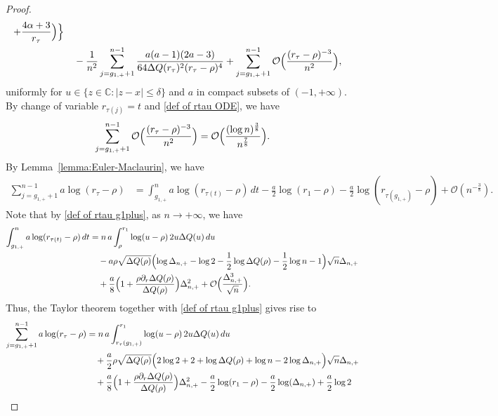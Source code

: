 \documentclass[reqno]{amsart}
\newcommand{\1}{\mathds{1}}
\newcommand{\C}{\mathds{C}}
\numberwithin{equation}{section}
\theoremstyle{definition}
\begin{document}
\begin{proof}
\begin{align*}
+\frac{4\alpha+3}{r_{\tau}}
\Bigr)
\Bigr\}
\\
&\quad
-\frac{1}{n^2}
\sum_{j=g_{1,+}+1}^{n-1}
\frac{a(a-1)(2a-3)}{64\Delta Q(r_{\tau})^2(r_{\tau}-\rho)^4}
+
\sum_{j=g_{1,+}+1}^{n-1}
\mathcal{O}\Bigl(\frac{(r_{\tau}-\rho)^{-3}}{n^2}\Bigr), 
\end{align*} 
uniformly for $u\in\{z\in\C:|z-x|\leq \delta\}$ and $a$ in compact subsets of $(-1,+\infty)$. 
By change of variable $r_{\tau(j)}=t$ and \eqref{def of rtau ODE}, we have 
\begin{equation}
\label{def of summation in 4 S3}
\sum_{j=g_{1,+}+1}^{n-1}
\mathcal{O}\Bigl(\frac{(r_{\tau}-\rho)^{-3}}{n^2}\Bigr)
=
\mathcal{O}\Bigl(\frac{(\log n)^{\frac{3}{8}}}{n^{\frac{7}{8}}}\Bigr). 
\end{equation}
By Lemma~\ref{lemma:Euler-Maclaurin}, we have 
\begin{align*}
\sum_{j=g_{1,+}+1}^{n-1}a\log(r_{\tau}-\rho)
&=  
\int_{g_{1,+}}^{n}a\log(r_{\tau(t)}-\rho)\,dt
-\frac{a}{2}\log(r_1-\rho)-\frac{a}{2}\log(r_{\tau(g_{1,+})}-\rho)
+\mathcal{O}(n^{-\frac{3}{8}}). 
\end{align*} 
Note that by \eqref{def of rtau g1plus}, as $n\to+\infty$, we have 
\begin{align*}
\int_{g_{1,+}}^{n}a\log(r_{\tau(t)}-\rho)\,dt
&=n\,a\int_{\rho}^{r_1}\log (u-\rho)\,2u\Delta Q(u)\,du
\\
&\quad
-a\rho\sqrt{\Delta Q(\rho)}
\Bigl( 
\log\Delta_{n,+}-\log 2-\frac{1}{2}\log\Delta Q(\rho)-\frac{1}{2}\log n-1
\Bigr)\sqrt{n}\Delta_{n,+}
\\
&\quad
+\frac{a}{8}\Bigl(1+\frac{\rho\partial_r\Delta Q(\rho)}{\Delta Q(\rho)}\Bigr)\Delta_{n,+}^2
+
\mathcal{O}\Bigl( 
\frac{\Delta_{n,+}^3}{\sqrt{n}}
\Bigr).
\end{align*}
Thus, the Taylor theorem together with \eqref{def of rtau g1plus} gives rise to
\begin{align}
\begin{split}
\label{def of summation in 1 S3}
\sum_{j=g_{1,+}+1}^{n-1}a\log(r_{\tau}-\rho)
&=  
n\,a\int_{r_{\tau}(g_{1,+})}^{r_1}\log (u-\rho)\,2u\Delta Q(u)\,du
\\
&\quad
+\frac{a}{2}\rho\sqrt{\Delta Q(\rho)}
\Bigl( 
2\log 2+2+\log\Delta Q(\rho)+\log n
-2\log\Delta_{n,+}
\Bigr)\sqrt{n}\Delta_{n,+}
\\
&\quad
+\frac{a}{8}\Bigl(1+\frac{\rho\partial_r\Delta Q(\rho)}{\Delta Q(\rho)}\Bigr)\Delta_{n,+}^2
-\frac{a}{2}\log(r_1-\rho)
-\frac{a}{2}\log(\Delta_{n,+})
+\frac{a}{2}\log2
\\

\end{split}
\end{align}
\end{proof}
\end{document}
